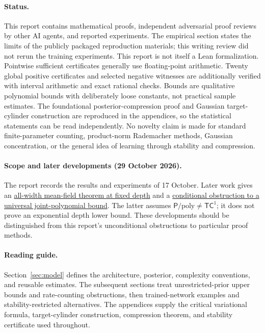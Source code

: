 \documentclass[11pt]{article}
\begin{document}
\paragraph{Status.}
This report contains mathematical proofs, independent adversarial proof
reviews by other AI agents, and reported experiments.
The empirical section states the limits of the publicly packaged reproduction
materials; this writing review did not rerun the training experiments. This report is not itself a Lean formalization. Pointwise sufficient certificates generally use floating-point arithmetic.
Twenty global positive certificates and selected negative witnesses are
additionally verified with interval arithmetic and exact rational checks. Bounds are qualitative polynomial bounds
with deliberately loose constants, not practical sample estimates.
The foundational posterior-compression proof and Gaussian target-cylinder
construction are reproduced in the
appendices, so the statistical statements can be read independently.
No novelty claim is made for standard finite-parameter counting,
product-norm Rademacher methods, Gaussian concentration, or the general
idea of learning through stability and compression.

\paragraph{Scope and later developments (29 October 2026).}
The report records the results and experiments of 17 October.
Later work gives an \href{https://github.com/kaarelh/AI-works/blob/main/neural-network-generalization/main-results/meanfield-all-width/paper.pdf}{all-width mean-field theorem at fixed depth} and a \href{https://github.com/kaarelh/AI-works/blob/main/neural-network-generalization/works-in-progress/conditional-nonpolynomial-learning/paper.pdf}{conditional obstruction to a universal joint-polynomial bound}. The latter assumes
$\mathsf P/\mathrm{poly}\ne\mathsf{TC}^1$; it does not prove an
exponential depth lower bound. These developments should be distinguished
from this report's unconditional obstructions to particular proof methods.

\paragraph{Reading guide.}
Section~\ref{sec:model} defines the architecture, posterior, complexity
conventions, and reusable estimates. The subsequent sections treat
unrestricted-prior upper bounds and rate-counting obstructions, then
trained-network examples and stability-restricted alternatives. The
appendices supply the critical variational formula, target-cylinder
construction, compression theorem, and stability certificate used throughout.
\end{document}
